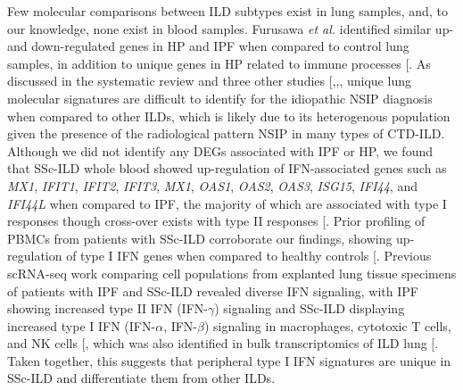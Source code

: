 \documentclass[
]{article}
\begin{document}
Few molecular comparisons between ILD subtypes exist in lung samples, and, to our knowledge, none exist in blood samples. Furusawa \textit{et al.} identified similar up- and down-regulated genes in HP and IPF when compared to control lung samples, in addition to unique genes in HP related to immune processes {[}\citeproc{ref-furusawa_chronic_2020}{67}{]}. As discussed in the systematic review and three other studies {[},,\citeproc{ref-horimasu_gene_2017}{83}{]}, unique lung molecular signatures are difficult to identify for the idiopathic NSIP diagnosis when compared to other ILDs, which is likely due to its heterogenous population given the presence of the radiological pattern NSIP in many types of CTD-ILD. Although we did not identify any DEGs associated with IPF or HP, we found that SSc-ILD whole blood showed up-regulation of IFN-associated genes such as \textit{MX1}, \textit{IFIT1}, \textit{IFIT2}, \textit{IFIT3}, \textit{MX1}, \textit{OAS1}, \textit{OAS2}, \textit{OAS3}, \textit{ISG15}, \textit{IFI44}, and \textit{IFI44L} when compared to IPF, the majority of which are associated with type I responses though cross-over exists with type II responses {[}\citeproc{ref-singhania_transcriptional_2019}{123}{]}. Prior profiling of PBMCs from patients with SSc-ILD corroborate our findings, showing up-regulation of type I IFN genes when compared to healthy controls {[}\citeproc{ref-tan_signatures_2006}{124}{]}. Previous scRNA-seq work comparing cell populations from explanted lung tissue specimens of patients with IPF and SSc-ILD revealed diverse IFN signaling, with IPF showing increased type II IFN (IFN-\(\gamma\)) signaling and SSc-ILD displaying increased type I IFN (IFN-\(\alpha\), IFN-\(\beta\)) signaling in macrophages, cytotoxic T cells, and NK cells {[}\citeproc{ref-valenzi_disparate_2021}{125}{]}, which was also identified in bulk transcriptomics of ILD lung {[}\citeproc{ref-christmann_association_2014}{126}{]}. Taken together, this suggests that peripheral type I IFN signatures are unique in SSc-ILD and differentiate them from other ILDs.
\end{document}
